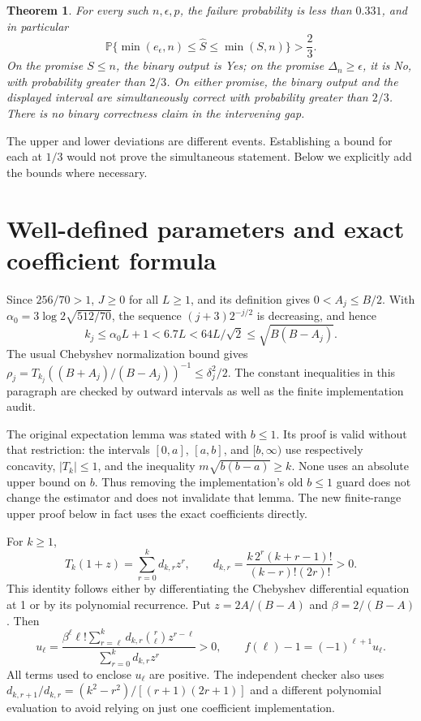 \documentclass[11pt]{article}
\newtheorem{theorem}{Theorem}
\newcommand{\Prb}{\mathbb P}
\begin{document}
\begin{theorem}\label{thm:main}
For every such $n,\epsilon,p$, the failure probability is less than
$0.331$, and in particular
\[
 \Prb\{\min(e_\epsilon,n)\le\widehat S\le\min(S,n)\}>\frac23.
\]
On the promise $S\le n$, the binary output is Yes; on the promise
$\Delta_n\ge\epsilon$, it is No, with probability greater than $2/3$.
On either promise, the binary output and the displayed interval are
simultaneously correct with probability greater than $2/3$.
There is no binary correctness claim in the intervening gap.
\end{theorem}

The upper and lower deviations are different events. Establishing a bound
for each at $1/3$ would not prove the simultaneous statement. Below we
explicitly add the bounds where necessary.

\section{Well-defined parameters and exact coefficient formula}
Since $256/70>1$, $J\ge0$ for all $L\ge1$, and its definition gives
$0<A_j\le B/2$. With
$\alpha_0=3\log2\sqrt{512/70}$, the sequence
$(j+3)2^{-j/2}$ is decreasing, and hence
\[
 k_j\le\alpha_0L+1<6.7L<64L/\sqrt2
 \le\sqrt{B(B-A_j)}.
\]
The usual Chebyshev normalization bound gives
$\rho_j=T_{k_j}((B+A_j)/(B-A_j))^{-1}\le\delta_j^2/2$.
The constant inequalities in this paragraph are checked by outward
intervals as well as the finite implementation audit.

The original expectation lemma was stated with $b\le1$. Its proof is
valid without that restriction: the intervals $[0,a]$, $[a,b]$, and
$[b,\infty)$ use respectively concavity, $|T_k|\le1$, and the inequality
$m\sqrt{b(b-a)}\ge k$. None uses an absolute upper bound on $b$.
Thus removing the implementation's old $b\le1$ guard does not change
the estimator and does not invalidate that lemma. The new finite-range
upper proof below in fact uses the exact coefficients directly.

For $k\ge1$,
\[
 T_k(1+z)=\sum_{r=0}^k d_{k,r}z^r,\qquad
 d_{k,r}=\frac{k\,2^r(k+r-1)!}{(k-r)!(2r)!}>0.
\]
This identity follows either by differentiating the Chebyshev differential
equation at 1 or by its polynomial recurrence. Put
$z=2A/(B-A)$ and $\beta=2/(B-A)$. Then
\begin{equation}\label{eq:coeff}
 u_\ell=
 \frac{\beta^\ell\ell!\sum_{r=\ell}^k d_{k,r}\binom r\ell z^{r-\ell}}
      {\sum_{r=0}^k d_{k,r}z^r}>0,\qquad
 f(\ell)-1=(-1)^{\ell+1}u_\ell.
\end{equation}
All terms used to enclose $u_\ell$ are positive. The independent checker
also uses
$d_{k,r+1}/d_{k,r}=(k^2-r^2)/[(r+1)(2r+1)]$ and a different polynomial
evaluation to avoid relying on just one coefficient implementation.
\end{document}
